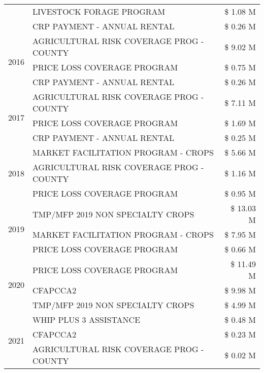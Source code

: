 \begin{tabular}{llr}
 & LIVESTOCK FORAGE PROGRAM & \$ 1.08 M \\
 & CRP PAYMENT - ANNUAL RENTAL & \$ 0.26 M \\
\cline{1-3}
\multirow[t]{3}{*}{2016} & AGRICULTURAL RISK COVERAGE PROG - COUNTY & \$ 9.02 M \\
 & PRICE LOSS COVERAGE PROGRAM & \$ 0.75 M \\
 & CRP PAYMENT - ANNUAL RENTAL & \$ 0.26 M \\
\cline{1-3}
\multirow[t]{3}{*}{2017} & AGRICULTURAL RISK COVERAGE PROG - COUNTY & \$ 7.11 M \\
 & PRICE LOSS COVERAGE PROGRAM & \$ 1.69 M \\
 & CRP PAYMENT - ANNUAL RENTAL & \$ 0.25 M \\
\cline{1-3}
\multirow[t]{3}{*}{2018} & MARKET FACILITATION PROGRAM - CROPS & \$ 5.66 M \\
 & AGRICULTURAL RISK COVERAGE PROG - COUNTY & \$ 1.16 M \\
 & PRICE LOSS COVERAGE PROGRAM & \$ 0.95 M \\
\cline{1-3}
\multirow[t]{3}{*}{2019} & TMP/MFP 2019 NON SPECIALTY CROPS & \$ 13.03 M \\
 & MARKET FACILITATION PROGRAM - CROPS & \$ 7.95 M \\
 & PRICE LOSS COVERAGE PROGRAM & \$ 0.66 M \\
\cline{1-3}
\multirow[t]{3}{*}{2020} & PRICE LOSS COVERAGE PROGRAM & \$ 11.49 M \\
 & CFAPCCA2 & \$ 9.98 M \\
 & TMP/MFP 2019 NON SPECIALTY CROPS & \$ 4.99 M \\
\cline{1-3}
\multirow[t]{3}{*}{2021} & WHIP PLUS 3 ASSISTANCE & \$ 0.48 M \\
 & CFAPCCA2 & \$ 0.23 M \\
 & AGRICULTURAL RISK COVERAGE PROG - COUNTY & \$ 0.02 M \\
\cline{1-3}
\bottomrule
\end{tabular}
